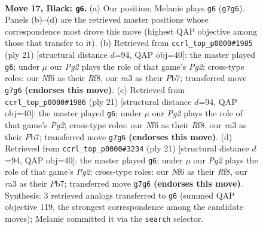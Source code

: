 \documentclass[11pt]{article}
\begin{document}
\clearpage

\begin{figure}[p]\centering
\begin{subfigure}{0.46\textwidth}\centering
\resizebox{\linewidth}{!}{%
\newchessgame
\chessboard[
  setfen={rnbq2k1/p4pp1/1pr2n2/3p2Np/P2P1P1P/RPNB2P1/3K4/3Q3R b - - 0 17},
  showmover=false,
  pgfstyle=straightmove, color=movearrow, markmove={g7-g6}
]}
\caption{}
\end{subfigure}\hfill
\begin{subfigure}{0.46\textwidth}\centering
\resizebox{\linewidth}{!}{%
\newchessgame
\chessboard[
  setfen={r4rk1/1ppb1ppp/p1nq1n2/3p4/3P4/2NBP1NP/PP3PP1/R2QK2R b KQ - 4 11},
  showmover=false,
  pgfstyle=straightmove, color=movearrow, markmove={g7-g6}
]}
\caption{}
\end{subfigure}
\\[4pt]
\begin{subfigure}{0.46\textwidth}\centering
\resizebox{\linewidth}{!}{%
\newchessgame
\chessboard[
  setfen={r4rk1/1ppb1ppp/p1nq1n2/3p4/3P4/2NBP1NP/PP3PP1/R2QK2R b KQ - 4 11},
  showmover=false,
  pgfstyle=straightmove, color=movearrow, markmove={g7-g6}
]}
\caption{}
\end{subfigure}\hfill
\begin{subfigure}{0.46\textwidth}\centering
\resizebox{\linewidth}{!}{%
\newchessgame
\chessboard[
  setfen={r4rk1/1ppb1ppp/p1nq1n2/3p4/3P4/2NBP1NP/PP3PP1/R2QK2R b KQ - 4 11},
  showmover=false,
  pgfstyle=straightmove, color=movearrow, markmove={g7-g6}
]}
\caption{}
\end{subfigure}
\caption{\textbf{Move 17, Black: \texttt{g6}.} (a) Our position; Melanie plays \texttt{g6} (\texttt{g7g6}). Panels (b)--(d) are the retrieved master positions whose correspondence most drove this move (highest QAP objective among those that transfer to it). (b) Retrieved from \texttt{ccrl\_top\_p0000\#1985} (ply 21) [structural distance $d$=94, QAP obj=40]: the master played \texttt{g6}; under $\mu$ our \emph{Pg2} plays the role of that game's \emph{Pg2}; cross-type roles: our \emph{N}f6 as their \emph{R}f8, our \emph{r}a3 as their \emph{P}b7; transferred move \texttt{g7g6} \textbf{(endorses this move)}. (c) Retrieved from \texttt{ccrl\_top\_p0000\#1986} (ply 21) [structural distance $d$=94, QAP obj=40]: the master played \texttt{g6}; under $\mu$ our \emph{Pg2} plays the role of that game's \emph{Pg2}; cross-type roles: our \emph{N}f6 as their \emph{R}f8, our \emph{r}a3 as their \emph{P}b7; transferred move \texttt{g7g6} \textbf{(endorses this move)}. (d) Retrieved from \texttt{ccrl\_top\_p0000\#3234} (ply 21) [structural distance $d$=94, QAP obj=40]: the master played \texttt{g6}; under $\mu$ our \emph{Pg2} plays the role of that game's \emph{Pg2}; cross-type roles: our \emph{N}f6 as their \emph{R}f8, our \emph{r}a3 as their \emph{P}b7; transferred move \texttt{g7g6} \textbf{(endorses this move)}. Synthesis: 3 retrieved analogs transferred to \texttt{g6} (summed QAP objective 119, the strongest correspondence among the candidate moves); Melanie committed it via the \texttt{search} selector.}
\label{fig:thought-m33}
\end{figure}
\end{document}
